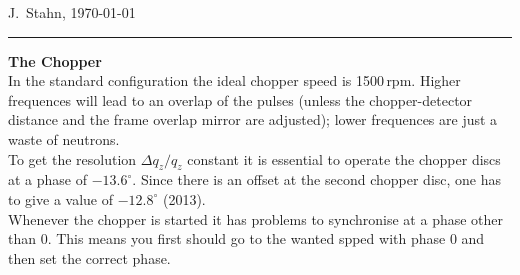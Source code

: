 \documentclass[10pt]{article}
\newcommand{\<}{$<$}
\renewcommand{\>}{\/$>$}
\begin{document}
\hfill{\color{gray}\tiny J.\ Stahn, \today}\\[-1.5ex]
\rule{\textwidth}{0.8mm}

\clearpage
\textbf{The Chopper}\\[1ex]

In the standard configuration the {\color{red}ideal chopper speed is 1500\,rpm}.
Higher frequences will lead to an overlap of the pulses (unless the
chopper-detector distance and the frame overlap mirror are adjusted);
lower frequences are just a waste of neutrons. \\

To get the resolution $\Delta q_z/q_z$ constant it is essential to 
operate the chopper discs at a {\color{red}phase of $-13.6^\circ$}. Since there is
an offset at the second chopper disc, one has to give a value of
$-12.8^\circ$ (2013).  \\
Whenever the chopper is started it has problems to synchronise at
a phase other than 0. This means you first should go to the wanted
spped with phase 0 and then set the correct phase. \\
\end{document}
